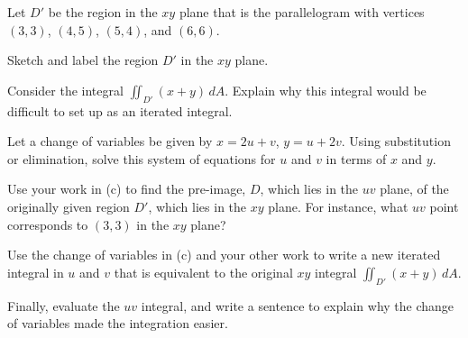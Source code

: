 \begin{exercises} 

\item Let $D'$ be the region in the $xy$ plane that is the parallelogram with vertices $(3,3)$, $(4,5)$, $(5,4)$, and $(6,6)$.
	\ba
	 	\item Sketch and label the region $D'$ in the $xy$ plane. 
		\item Consider the integral $\iint_{D'} (x+y) \, dA$.  Explain why this integral would be difficult to set up as an iterated integral.
		\item Let a change of variables be given by $x = 2u + v$, $y = u + 2v$.  Using substitution or elimination, solve this system of equations for $u$ and $v$ in terms of $x$ and $y$.
		\item Use your work in (c) to find the pre-image, $D$, which lies in the $uv$ plane, of the originally given region $D'$, which lies in the $xy$ plane.  For instance, what $uv$ point corresponds to $(3,3)$ in the $xy$ plane?
		\item Use the change of variables in (c) and your other work to write a new iterated integral in $u$ and $v$ that is equivalent to the original $xy$ integral $\iint_{D'} (x+y) \, dA$.
		\item Finally, evaluate the $uv$ integral, and write a sentence to explain why the change of variables made the integration easier.
	\ea



\end{exercises}
